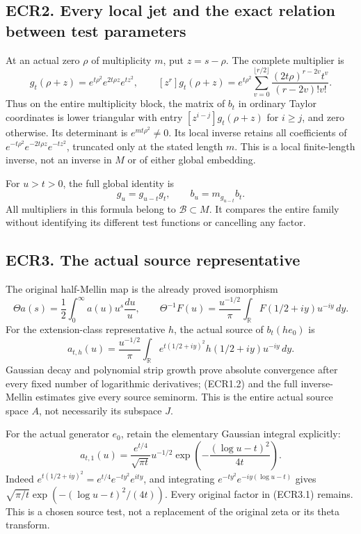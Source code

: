 \subsection{ECR2. Every local jet and the exact relation between test
parameters}\label{ecr2.-every-local-jet-and-the-exact-relation-between-test-parameters}

At an actual zero \(\rho\) of multiplicity \(m\), put \(z=s-\rho\). The
complete multiplier is \[
g_t(\rho+z)=e^{t\rho^2}e^{2t\rho z}e^{tz^2},
\qquad
[z^r]g_t(\rho+z)
=e^{t\rho^2}\sum_{v=0}^{\lfloor r/2\rfloor}
\frac{(2t\rho)^{r-2v}t^v}{(r-2v)!v!}.
\tag{ECR2.1}
\] Thus on the entire multiplicity block, the matrix of \(b_t\) in
ordinary Taylor coordinates is lower triangular with entry
\([z^{i-j}]g_t(\rho+z)\) for \(i\ge j\), and zero otherwise. Its
determinant is \(e^{mt\rho^2}\ne0\). Its local inverse retains all
coefficients of \(e^{-t\rho^2}e^{-2t\rho z}e^{-tz^2}\), truncated only
at the stated length \(m\). This is a local finite-length inverse, not
an inverse in \(M\) or of either global embedding.

For \(u>t>0\), the full global identity is \[
g_u=g_{u-t}g_t,\qquad b_u=m_{g_{u-t}}b_t.
\tag{ECR2.2}
\] All multipliers in this formula belong to \(\mathcal B\subset M\). It
compares the entire family without identifying its different test
functions or cancelling any factor.

\subsection{ECR3. The actual source
representative}\label{ecr3.-the-actual-source-representative}

The original half-Mellin map is the already proved isomorphism \[
\Theta a(s)=\frac12\int_0^\infty a(u)u^s\frac{du}{u},
\qquad
\Theta^{-1}F(u)=\frac{u^{-1/2}}\pi
\int_{\mathbb R}F(1/2+iy)u^{-iy}\,dy.
\tag{ECR3.1}
\] For the extension-class representative \(h\), the actual source of
\(b_t(h e_0)\) is \[
a_{t,h}(u)=\frac{u^{-1/2}}\pi
\int_{\mathbb R}e^{t(1/2+iy)^2}h(1/2+iy)u^{-iy}\,dy.
\tag{ECR3.2}
\] Gaussian decay and polynomial strip growth prove absolute convergence
after every fixed number of logarithmic derivatives; (ECR1.2) and the
full inverse-Mellin estimates give every source seminorm. This is the
entire actual source space \(A\), not necessarily its subspace \(J\).

For the actual generator \(e_0\), retain the elementary Gaussian
integral explicitly: \[
a_{t,1}(u)=\frac{e^{t/4}}{\sqrt{\pi t}}u^{-1/2}
\exp\!\left(-\frac{(\log u-t)^2}{4t}\right).
\tag{ECR3.3}
\] Indeed \(e^{t(1/2+iy)^2}=e^{t/4}e^{-ty^2}e^{ity}\), and integrating
\(e^{-ty^2}e^{-iy(\log u-t)}\) gives
\(\sqrt{\pi/t}\exp(- (\log u-t)^2/(4t))\). Every original factor in
(ECR3.1) remains. This is a chosen source test, not a replacement of the
original zeta or its theta transform.

